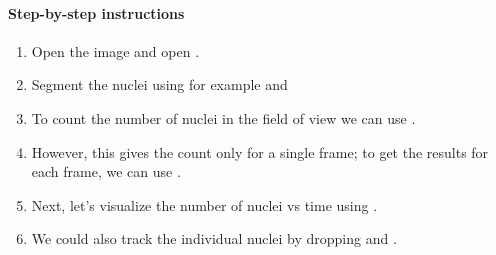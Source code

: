 \paragraph{Step-by-step instructions}

\begin{enumerate}
    \item Open the image  and open .
    \item Segment the nuclei using for example  and 
    \item To count the number of nuclei in the field of view we can use .
    \item However, this gives the count only for a single frame; to get the results for each frame, we can use .
    \item Next, let's visualize the number of nuclei vs time using .
    \item We could also track the individual nuclei by dropping  and .
\end{enumerate}
